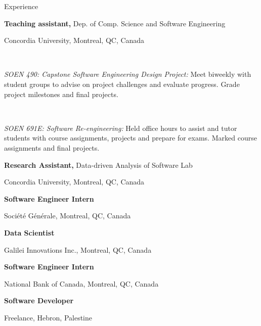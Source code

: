 \begin{rubric}{Experience}

	\textbf{Teaching assistant,} Dep. of Comp. Science and Software Engineering
	\par Concordia University, Montreal, QC, Canada
	\par~\par \textit{SOEN 490: Capstone Software Engineering Design Project:} Meet biweekly with student groups to advise on project challenges and evaluate progress. Grade project milestones and final projects.
	\par~\par \textit{SOEN 691E: Software Re-engineering:} Held office hours to assist and tutor students with course assignments, projects and prepare for exams. Marked course assignments and final projects.

	\textbf{Research Assistant,} Data-driven Analysis of Software Lab
	\par Concordia University, Montreal, QC, Canada


	\textbf{Software Engineer Intern}
	\par Société Générale, Montreal, QC, Canada

	\textbf{Data Scientist}
	\par Galilei Innovations Inc., Montreal, QC, Canada

	\textbf{Software Engineer Intern}
	\par National Bank of Canada, Montreal, QC, Canada

	\textbf{Software Developer}
	\par Freelance, Hebron, Palestine
\end{rubric}
